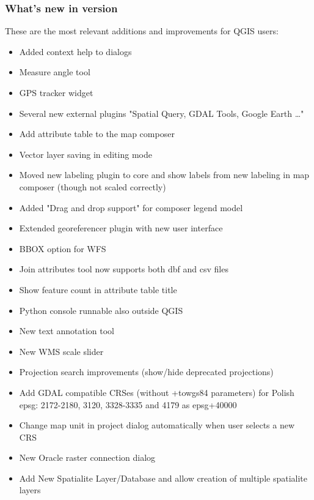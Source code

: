 \subsubsection{What's new in version \CURRENT} 

These are the most relevant additions and improvements for QGIS users:
\begin{itemize}[label=--]
 \item Added context help to dialogs
 \item Measure angle tool
 \item GPS tracker widget
 \item Several new external plugins "Spatial Query, GDAL Tools, Google Earth \dots"
 \item Add attribute table to the map composer
 \item Vector layer saving in editing mode 
 \item Moved new labeling plugin to core and show labels from new labeling in map composer (though not scaled correctly)
 \item Added "Drag and drop support" for composer legend model
 \item Extended georeferencer plugin with new user interface
 \item BBOX option for WFS 
 \item Join attributes tool now supports both dbf and csv files %
 \item Show feature count in attribute table title
 \item Python console runnable also outside QGIS
 \item New text annotation tool
 \item New WMS scale slider
 \item Projection search improvements (show/hide deprecated projections)
 \item Add GDAL compatible CRSes (without +towgs84 parameters) for Polish epsg: 2172-2180, 3120, 3328-3335 and 4179 as epsg+40000
 \item Change map unit in project dialog automatically when user selects a new CRS
 \item New Oracle raster connection dialog 
 \item Add New Spatialite Layer/Database and allow creation of multiple spatialite layers

\end{itemize}
